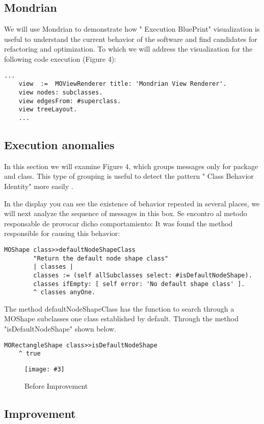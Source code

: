 \documentclass{sig-alternate}
\newcommand{\largefig}[4]{
	\begin{figure*}[#1]
		\centering
		\texttt{[image: \#3]}
		\caption{\label{fig:#3}#4}
	\end{figure*}}
\begin{document}
\subsection{Mondrian}

We will use Mondrian to demonstrate how " Execution BluePrint" visualization is useful to understand the current behavior of the software and find candidates for refactoring and optimization. To which we will address the visualization for the following code execution (Figure 4):
\begin{lstlisting}[language=Smalltalk]
	...
	view  :=  MOViewRenderer title: 'Mondrian View Renderer'.
	view nodes: subclasses.
	view edgesFrom: #superclass.
	view treeLayout.
	...
\end{lstlisting}


\subsection{Execution anomalies}

In this section we will examine Figure 4, which groups messages only for package and class. This type of grouping is useful to detect the pattern " Class Behavior Identity" more easily .

In the display you can see the existence of behavior repeated in several places, we  will next analyze the sequence of messages in this box.
Se encontro al metodo responsable de provocar dicho comportamiento:
It was found the method responsible for causing this behavior:

\begin{lstlisting}[language=Smalltalk]
MOShape class>>defaultNodeShapeClass
		"Return the default node shape class"
		| classes |
		classes := (self allSubclasses select: #isDefaultNodeShape).
		classes ifEmpty: [ self error: 'No default shape class' ].
		^ classes anyOne.
\end{lstlisting} 

The method defaultNodeShapeClass has the function to search through a MOShape subclasses one class established by default. Through the method "isDefaultNodeShape" shown below.

\begin{lstlisting}[language=Smalltalk]
MORectangleShape class>>isDefaultNodeShape
	^ true
\end{lstlisting} 

\largefig{}{1.0}{Mondrian1}{Before Improvement}
\subsection{Improvement}
\end{document}
